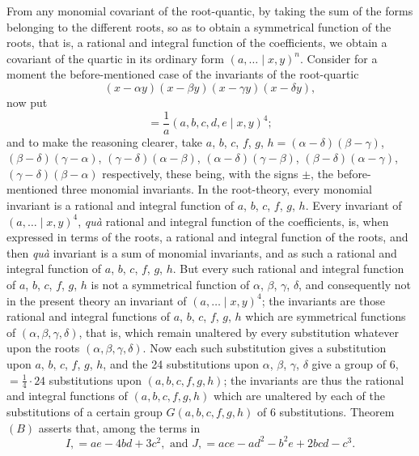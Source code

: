 \documentclass[11pt,a4paper,english]{article}
\theoremstyle{plain}
\begin{document}
From any monomial covariant of the root-quantic, by taking the sum of the forms belonging to the different roots, so as to obtain a symmetrical function of the roots, that is, a rational and integral function of the coefficients, we obtain a covariant of the quartic in its ordinary form $(a, \ldots \mid x, y)^n$. Consider for a moment the before-mentioned case of the invariants of the root-quartic
\[
(x - \alpha y)(x - \beta y)(x - \gamma y)(x - \delta y),
\]
now put
\[
= \frac{1}{a}(a, b, c, d, e \mid x, y)^4;
\]
and to make the reasoning clearer, take $a$, $b$, $c$, $f$, $g$, $h = (\alpha - \delta)(\beta - \gamma)$, $(\beta - \delta)(\gamma - \alpha)$, $(\gamma - \delta)(\alpha - \beta)$, $(\alpha - \delta)(\gamma - \beta)$, $(\beta - \delta)(\alpha - \gamma)$, $(\gamma - \delta)(\beta - \alpha)$ respectively, these being, with the signs $\pm$, the before-mentioned three monomial invariants. In the root-theory, every monomial invariant is a rational and integral function of $a$, $b$, $c$, $f$, $g$, $h$. Every invariant of $(a, \ldots \mid x, y)^4$, \textit{qu\`{a}} rational and integral function of the coefficients, is, when expressed in terms of the roots, a rational and integral function of the roots, and then \textit{qu\`{a}} invariant is a sum of monomial invariants, and as such a rational and integral function of $a$, $b$, $c$, $f$, $g$, $h$. But every such rational and integral function of $a$, $b$, $c$, $f$, $g$, $h$ is not a symmetrical function of $\alpha$, $\beta$, $\gamma$, $\delta$, and consequently not in the present theory an invariant of $(a, \ldots \mid x, y)^4$; the invariants are those rational and integral functions of $a$, $b$, $c$, $f$, $g$, $h$ which are symmetrical functions of $(\alpha, \beta, \gamma, \delta)$, that is, which remain unaltered by every substitution whatever upon the roots $(\alpha, \beta, \gamma, \delta)$. Now each such substitution gives a substitution upon $a$, $b$, $c$, $f$, $g$, $h$, and the 24 substitutions upon $\alpha$, $\beta$, $\gamma$, $\delta$ give a group of $6$, $= \frac{1}{4} \cdot 24$ substitutions upon $(a, b, c, f, g, h)$; the invariants are thus the rational and integral functions of $(a, b, c, f, g, h)$ which are unaltered by each of the substitutions of a certain group $G(a, b, c, f, g, h)$ of 6 substitutions. Theorem $(B)$ asserts that, among the terms in
\[
I, = ae - 4bd + 3c^2, \text{ and } J, = ace - ad^2 - b^2e + 2bcd - c^3.
\]
\end{document}
